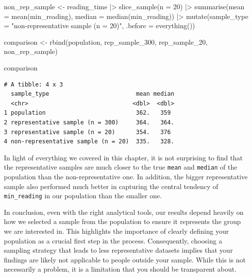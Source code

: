 \documentclass[
  letterpaper,
]{krantz}
\makeatletter
\newenvironment{Shaded}{\begin{snugshade}}{\end{snugshade}}
\newcommand{\AttributeTok}[1]{\textcolor[rgb]{0.40,0.45,0.13}{#1}}
\newcommand{\DecValTok}[1]{\textcolor[rgb]{0.68,0.00,0.00}{#1}}
\newcommand{\FunctionTok}[1]{\textcolor[rgb]{0.28,0.35,0.67}{#1}}
\newcommand{\NormalTok}[1]{\textcolor[rgb]{0.00,0.23,0.31}{#1}}
\newcommand{\OtherTok}[1]{\textcolor[rgb]{0.00,0.23,0.31}{#1}}
\newcommand{\SpecialCharTok}[1]{\textcolor[rgb]{0.37,0.37,0.37}{#1}}
\newcommand{\StringTok}[1]{\textcolor[rgb]{0.13,0.47,0.30}{#1}}
\newenvironment{kframe}{%
\medskip{}
\setlength{\fboxsep}{.8em}
 \def\at@end@of@kframe{}%
 \ifinner\ifhmode%
  \def\at@end@of@kframe{\end{minipage}}%
  \begin{minipage}{\columnwidth}%
 \fi\fi%
 \def\FrameCommand##1{\hskip\@totalleftmargin \hskip-\fboxsep
 \colorbox{shadecolor}{##1}\hskip-\fboxsep
     \hskip-\linewidth \hskip-\@totalleftmargin \hskip\columnwidth}%
 \MakeFramed {\advance\hsize-\width
   \@totalleftmargin\z@ \linewidth\hsize
   \@setminipage}}%
 {\par\unskip\endMakeFramed%
 \at@end@of@kframe}
\renewenvironment{Shaded}{\begin{kframe}}{\end{kframe}}
\makeatother
\begin{document}
\begin{Shaded}
\begin{Highlighting}[]
\NormalTok{non\_rep\_sample }\OtherTok{\textless{}{-}}
\NormalTok{  reading\_time }\SpecialCharTok{|\textgreater{}}
  \FunctionTok{slice\_sample}\NormalTok{(}\AttributeTok{n =} \DecValTok{20}\NormalTok{) }\SpecialCharTok{|\textgreater{}}
  \FunctionTok{summarise}\NormalTok{(}\AttributeTok{mean =} \FunctionTok{mean}\NormalTok{(min\_reading),}
            \AttributeTok{median =} \FunctionTok{median}\NormalTok{(min\_reading)) }\SpecialCharTok{|\textgreater{}}
  \FunctionTok{mutate}\NormalTok{(}\AttributeTok{sample\_type =} \StringTok{"non{-}representative sample (n = 20)"}\NormalTok{,}
         \AttributeTok{.before =} \FunctionTok{everything}\NormalTok{())}

\NormalTok{comparison }\OtherTok{\textless{}{-}} \FunctionTok{rbind}\NormalTok{(population, rep\_sample\_300,}
\NormalTok{                    rep\_sample\_20, non\_rep\_sample)}

\NormalTok{comparison}
\end{Highlighting}
\end{Shaded}

\begin{verbatim}
# A tibble: 4 x 3
  sample_type                         mean median
  <chr>                              <dbl>  <dbl>
1 population                          362.   359 
2 representative sample (n = 300)     364.   364.
3 representative sample (n = 20)      354.   376 
4 non-representative sample (n = 20)  335.   328.
\end{verbatim}

In light of everything we covered in this chapter, it is not surprising
to find that the representative samples are much closer to the true
\texttt{mean} and \texttt{median} of the population than the
non-representative one. In addition, the bigger representative sample
also performed much better in capturing the central tendency of
\texttt{min\_reading} in our population than the smaller one.

In conclusion, even with the right analytical tools, our results depend
heavily on how we selected a sample from the population to ensure it
represents the group we are interested in. This highlights the
importance of clearly defining your population as a crucial first step
in the process. Consequently, choosing a sampling strategy that leads to
less representative datasets implies that your findings are likely not
applicable to people outside your sample. While this is not necessarily
a problem, it is a limitation that you should be transparent about.
\end{document}
